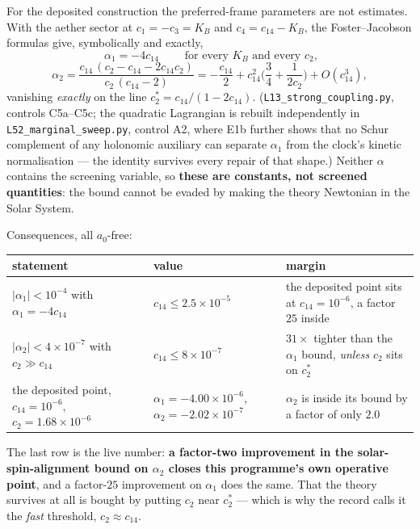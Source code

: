 \documentclass[11pt,letterpaper]{article}
\begin{document}
For the deposited construction the preferred-frame parameters are not estimates. With the aether sector at $c_1=-c_3=K_B$ and $c_4=c_{14}-K_B$, the Foster--Jacobson formulas \cite{FosterJacobson2006} give, symbolically and exactly,
\begin{equation}
\boxed{\;\alpha_1=-4c_{14}\;}\qquad\text{for every }K_B\text{ and every }c_2,
\end{equation}
\begin{equation}
\alpha_2=\frac{c_{14}\,(c_2-c_{14}-2c_{14}c_2)}{c_2\,(c_{14}-2)}=-\frac{c_{14}}{2}+c_{14}^2\Big(\frac{3}{4}+\frac{1}{2c_2}\Big)+O(c_{14}^3),
\end{equation}
vanishing \emph{exactly} on the line $c_2^\ast=c_{14}/(1-2c_{14})$. (\texttt{L13\_strong\_coupling.py}, controls C5a--C5c; the quadratic Lagrangian is rebuilt independently in \texttt{L52\_marginal\_sweep.py}, control A2, where E1b further shows that no Schur complement of any holonomic auxiliary can separate $\alpha_1$ from the clock's kinetic normalisation --- the identity survives every repair of that shape.) Neither $\alpha$ contains the screening variable, so \textbf{these are constants, not screened quantities}: the bound cannot be evaded by making the theory Newtonian in the Solar System.

Consequences, all $a_0$-free:
\begin{center}\small
\begin{tabular}{L{0.34\textwidth}L{0.28\textwidth}L{0.30\textwidth}}\toprule
statement & value & margin\\\midrule
$|\alpha_1|<10^{-4}$ with $\alpha_1=-4c_{14}$ & $c_{14}\le2.5\times10^{-5}$ & the deposited point sits at $c_{14}=10^{-6}$, a factor $25$ inside\\
$|\alpha_2|<4\times10^{-7}$ with $c_2\gg c_{14}$ & $c_{14}\le8\times10^{-7}$ & $31\times$ tighter than the $\alpha_1$ bound, \emph{unless} $c_2$ sits on $c_2^\ast$\\
the deposited point, $c_{14}=10^{-6}$, $c_2=1.68\times10^{-6}$ & $\alpha_1=-4.00\times10^{-6}$, $\alpha_2=-2.02\times10^{-7}$ & $\alpha_2$ is inside its bound by a factor of only $\mathbf{2.0}$\\\bottomrule
\end{tabular}
\end{center}
The last row is the live number: \textbf{a factor-two improvement in the solar-spin-alignment bound on $\alpha_2$ closes this programme's own operative point}, and a factor-$25$ improvement on $\alpha_1$ does the same. That the theory survives at all is bought by putting $c_2$ near $c_2^\ast$ --- which is why the record calls it the \emph{fast} threshold, $c_2\approx c_{14}$.
\end{document}
